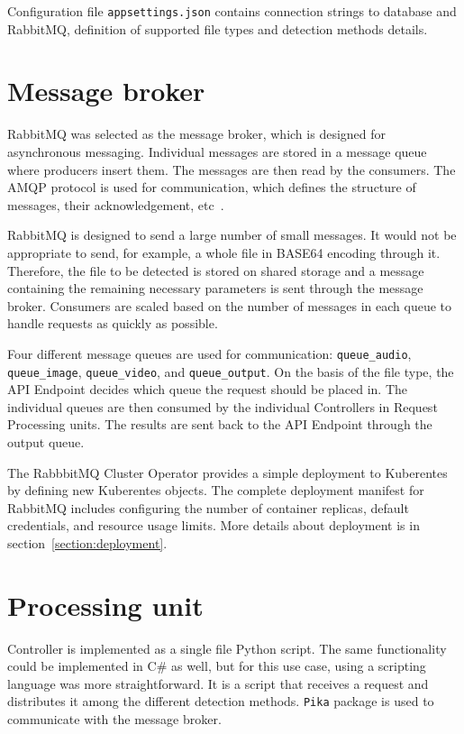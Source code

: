 Configuration file \texttt{appsettings.json} contains connection strings to database and RabbitMQ, definition of supported file types and detection methods details.

\section{Message broker}

RabbitMQ was selected as the message broker, which is designed for asynchronous messaging. Individual messages are stored in a message queue where producers insert them. The messages are then read by the consumers. The AMQP protocol is used for communication, which defines the structure of messages, their acknowledgement, etc~\cite{AMQP}.

RabbitMQ is designed to send a large number of small messages. It would not be appropriate to send, for example, a whole file in BASE64 encoding through it. Therefore, the file to be detected is stored on shared storage and a message containing the remaining necessary parameters is sent through the message broker. Consumers are scaled based on the number of messages in each queue to handle requests as quickly as possible.

Four different message queues are used for communication: \texttt{queue\_audio}, \texttt{queue\_image}, \texttt{queue\_video}, and \texttt{queue\_output}. On the basis of the file type, the API Endpoint decides which queue the request should be placed in. The individual queues are then consumed by the individual Controllers in Request Processing units. The results are sent back to the API Endpoint through the output queue.

The RabbbitMQ Cluster Operator provides a simple deployment to Kuberentes by defining new Kuberentes objects. The complete deployment manifest for RabbitMQ includes configuring the number of container replicas, default credentials, and resource usage limits. More details about deployment is in section~\ref{section:deployment}.~\cite{RabbitMQOperator}

\section{Processing unit}

Controller is implemented as a single file Python script. The same functionality could be implemented in C\# as well, but for this use case, using a scripting language was more straightforward. It is a script that receives a request and distributes it among the different detection methods. \texttt{Pika} package is used to communicate with the message broker.

